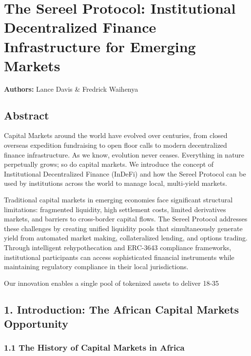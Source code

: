 \documentclass[12pt]{article}
\begin{document}
\section{The Sereel Protocol: Institutional Decentralized Finance Infrastructure for Emerging Markets} %

\textbf{Authors:} Lance Davis \& Fredrick Waihenya

\subsection{Abstract} %

Capital Markets around the world have evolved over centuries, from closed overseas expedition fundraising to open floor calls to modern decentralized finance infrastructure. As we know, evolution never ceases. Everything in nature perpetually grows; so do capital markets. We introduce the concept of Institutional Decentralized Finance (InDeFi) and how the Sereel Protocol can be used by institutions across the world to manage local, multi-yield markets.

Traditional capital markets in emerging economies face significant structural limitations: fragmented liquidity, high settlement costs, limited derivatives markets, and barriers to cross-border capital flows. The Sereel Protocol addresses these challenges by creating unified liquidity pools that simultaneously generate yield from automated market making, collateralized lending, and options trading. Through intelligent rehypothecation and ERC-3643 compliance frameworks, institutional participants can access sophisticated financial instruments while maintaining regulatory compliance in their local jurisdictions.

Our innovation enables a single pool of tokenized assets to deliver 18-35%

\subsection{1. Introduction: The African Capital Markets Opportunity} %

\subsubsection{1.1 The History of Capital Markets in Africa} %
\end{document}
